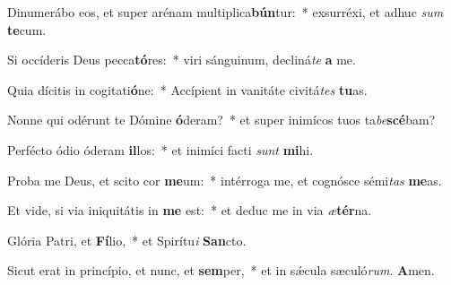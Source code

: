 \item Dinumerábo eos, et super arénam multiplica\textbf{bún}tur:~* exsurréxi, et adhuc \textit{sum} \textbf{te}cum.
\item Si occíderis Deus pecca\textbf{tó}res:~* viri sánguinum, decliná\hspace*{0.03em}\textit{te} \textbf{a} me.
\item Quia dícitis in cogitati\textbf{ó}ne:~* Accípient in vanitáte civitá\hspace*{0.03em}\textit{tes} \textbf{tu}as.
\item Nonne qui odérunt te Dómine \textbf{ó}deram?~* et super inimícos tuos ta\textit{be}\textbf{scé}bam?
\item Perfécto ódio óderam \textbf{il}los:~* et inimíci facti \textit{sunt} \textbf{mi}hi.
\item Proba me Deus, et scito cor \textbf{me}um:~* intérroga me, et cognósce sémi\hspace*{0.03em}\textit{tas} \textbf{me}as.
\item Et vide, si via iniquitátis in \textbf{me} est:~* et deduc me in via \textit{æ}\textbf{tér}na.
\item Glória Patri, et \textbf{Fí}lio,~* et Spirítu\textit{i} \textbf{San}cto.
\item Sicut erat in princípio, et nunc, et \textbf{sem}per,~* et in sǽcula sæculó\textit{rum}. \textbf{A}men.
